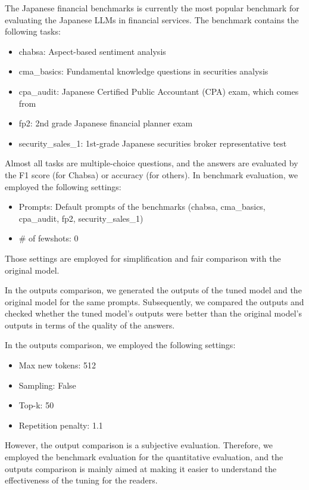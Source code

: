The Japanese financial benchmarks \cite{Hirano2023-finnlpkdf} is currently the most popular benchmark for evaluating the Japanese LLMs in financial services.
The benchmark contains the following tasks:
\begin{itemize}
    \item chabsa: Aspect-based sentiment analysis
    \item cma\_basics: Fundamental knowledge questions in securities analysis
    \item cpa\_audit: Japanese Certified Public Accountant (CPA) exam, which comes from \cite{Masuda2023}
    \item fp2: 2nd grade Japanese financial planner exam
    \item security\_sales\_1: 1st-grade Japanese securities broker representative test
\end{itemize}
Almost all tasks are multiple-choice questions, and the answers are evaluated by the F1 score (for Chabsa) or accuracy (for others).
In benchmark evaluation, we employed the following settings:
\begin{itemize}
    \item Prompts: Default prompts of the benchmarks (chabsa, cma\_basics, cpa\_audit, fp2, security\_sales\_1)
    \item \# of fewshots: 0
\end{itemize}
Those settings are employed for simplification and fair comparison with the original model.

In the outputs comparison, we generated the outputs of the tuned model and the original model for the same prompts.
Subsequently, we compared the outputs and checked whether the tuned model's outputs were better than the original model's outputs in terms of the quality of the answers.

In the outputs comparison, we employed the following settings:
\begin{itemize}
    \item Max new tokens: 512
    \item Sampling: False
    \item Top-k: 50
    \item Repetition penalty: 1.1
\end{itemize}

However, the output comparison is a subjective evaluation.
Therefore, we employed the benchmark evaluation for the quantitative evaluation, and the outputs comparison is mainly aimed at making it easier to understand the effectiveness of the tuning for the readers.

